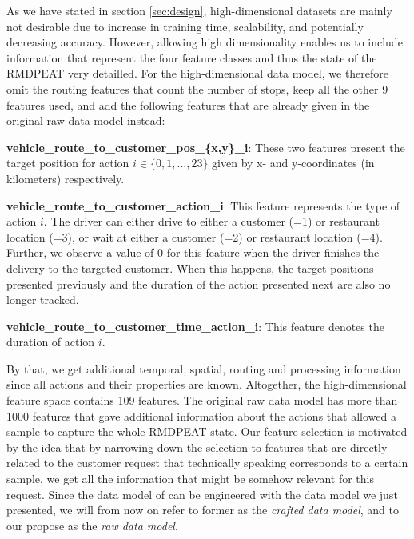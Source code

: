 As we have stated in section \ref{sec:design}, high-dimensional datasets are mainly not desirable due to increase in training time, scalability, and potentially decreasing accuracy. However, allowing high dimensionality enables us to include information that represent the four feature classes and thus the state of the RMDPEAT very detailled. For the high-dimensional data model, we therefore omit the routing features that count the number of stops, keep all the other 9 features \cite{Hildebrandt2020_EAT} used, and add the following features that are already given in the original raw data model instead:
\begin{description}[font=$\bullet$\scshape\bfseries]
	\item \textbf{vehicle\_route\_to\_customer\_pos\_\{x,y\}\_i}: These two features present the target position for action $ i \in \{0, 1, \dots, 23\}$ given by x- and y-coordinates (in kilometers) respectively. 
	\item  \textbf{vehicle\_route\_to\_customer\_action\_i}:
	This feature represents the type of action $ i $. The driver can either drive to either a customer (=1) or restaurant location (=3), or wait at either a customer (=2) or restaurant location (=4). Further, we observe a value of 0 for this feature when the driver finishes the delivery to the targeted customer. When this happens, the target positions presented previously and the duration of the action presented next are also no longer tracked. 
	\item
	\textbf{vehicle\_route\_to\_customer\_time\_action\_i}: This feature denotes the duration of action $ i $.
\end{description}
By that, we get additional temporal, spatial, routing and processing information since all actions and their properties are known. Altogether, the high-dimensional feature space contains 109 features. The original raw data model has more than 1000 features that gave additional information about the actions that allowed a sample to capture the whole RMDPEAT state. Our feature selection is motivated by the idea that by narrowing down the selection to features that are directly related to the customer request that technically speaking corresponds to a certain sample, we get all the information that might be somehow relevant for this request. Since the data model of \cite{Hildebrandt2020_EAT} can be engineered with the data model we just presented, we will from now on refer to former as the \textit{crafted data model}, and to our propose as the \textit{raw data model}.

